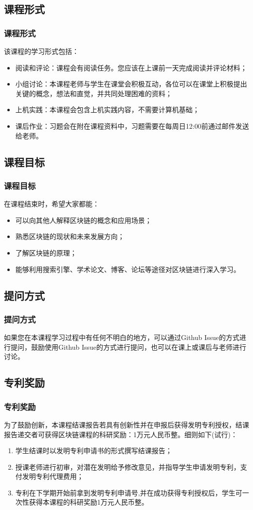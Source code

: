 \documentclass[11pt]{beamer}
\begin{document}
\subsection{课程形式}
\begin{frame}
	\frametitle{课程形式}
	该课程的学习形式包括：
	\begin{itemize}
		\item 阅读和评论：课程会有阅读任务。您应该在上课前一天完成阅读并评论材料；
		\item 小组讨论：本课程老师与学生在课堂会积极互动，各位可以在课堂上积极提出关键的概念，想法和直觉，并共同处理困难的资料；
		\item 上机实践：本课程会包含上机实践内容，不需要计算机基础；
		\item 课后作业：习题会在附在课程资料中，习题需要在每周日12:00前通过邮件发送给老师。
	\end{itemize}
\end{frame}

\subsection{课程目标}
\begin{frame}
	\frametitle{课程目标}
	在课程结束时，希望大家都能：
	\begin{itemize}
		\item 可以向其他人解释区块链的概念和应用场景；
		\item 熟悉区块链的现状和未来发展方向；
		\item 了解区块链的原理；
		\item 能够利用搜索引擎、学术论文、博客、论坛等途径对区块链进行深入学习。
	\end{itemize}
\end{frame}

\subsection{提问方式}
\begin{frame}
	\frametitle{提问方式}
	如果您在本课程学习过程中有任何不明白的地方，可以通过Github Issue的方式进行提问，鼓励使用Github Issue的方式进行提问，也可以在课上或课后与老师进行讨论。
\end{frame}

\subsection{专利奖励}
\begin{frame}
	\frametitle{专利奖励}
	为了鼓励创新，本课程结课报告若具有创新性并在申报后获得发明专利授权，结课报告递交者可获得区块链课程的科研奖励：1万元人民币整。细则如下(试行)：
	\begin{enumerate}
		\item 学生结课时以发明专利申请书的形式撰写结课报告；
		\item 授课老师进行初审，对潜在发明给予修改意见，并指导学生申请发明专利，支付发明专利代理费用；
		\item 专利在下学期开始前拿到发明专利申请号,并在成功获得专利授权后，学生可一次性获得本课程的科研奖励1万元人民币整。
	\end{enumerate}
\end{frame}
\end{document}
